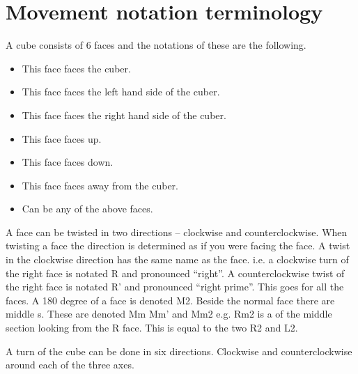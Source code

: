 \section{Movement notation terminology}
\label{sec:moveNotation}
A cube consists of 6 faces and the notations of these are the following.
\begin{itemize}
\item {}This face faces the cuber.
\item {}This face faces the left hand side of the cuber.
\item {}This face faces the right hand side of the cuber.
\item {}This face faces up.
\item {}This face faces down.
\item {}This face faces away from the cuber.
\item {}Can be any of the above faces.
\end{itemize} 

A face can be twisted in two directions -- clockwise and counterclockwise. When twisting a face the direction is determined as if you were facing the face.
A twist in the clockwise direction has the same name as the face. i.e. a clockwise turn of the right face is notated R and pronounced ``right''.
A counterclockwise twist of the right face is notated R' and pronounced ``right prime''. This goes for all the faces.
A 180 degree \twist{} of a face is denoted M2. 
Beside the normal face \twist{} there are middle \twist{}s. These are denoted Mm Mm' and Mm2 e.g. Rm2 is a \twist{} of the middle section looking from the R face. This \twist{} is equal to the two \twist{} R2 and L2.  

A turn of the cube can be done in six directions. Clockwise and counterclockwise around each of the three axes.

